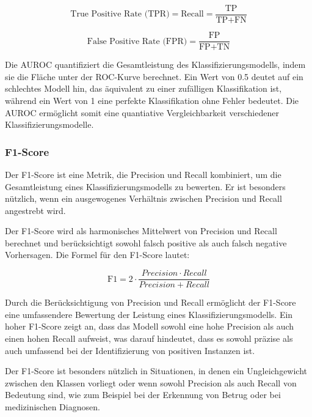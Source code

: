 \begin{equation}
    \text{True Positive Rate (TPR)} = \text{Recall} =\frac{\text{TP}}{\text{TP} + \text{FN}}
    \label{eq:TPR}
\end{equation}

\begin{equation}
    \text{False Positive Rate (FPR)} = \frac{\text{FP}}{\text{FP} + \text{TN}} 
    \label{eq:FPR}
\end{equation}

Die AUROC quantifiziert die Gesamtleistung des Klassifizierungsmodells, indem sie die Fläche unter der ROC-Kurve berechnet. Ein Wert von 0.5 deutet auf ein schlechtes Modell hin, das äquivalent zu einer zufälligen Klassifikation ist, während ein Wert von 1 eine perfekte Klassifikation ohne Fehler bedeutet. Die AUROC ermöglicht somit eine quantiative Vergleichbarkeit verschiedener Klassifizierungsmodelle.


\subsubsection{F1-Score}
Der F1-Score ist eine Metrik, die Precision und Recall kombiniert, um die Gesamtleistung eines Klassifizierungsmodells zu bewerten. Er ist besonders nützlich, wenn ein ausgewogenes Verhältnis zwischen Precision und Recall angestrebt wird.

Der F1-Score wird als harmonisches Mittelwert von Precision und Recall berechnet und berücksichtigt sowohl falsch positive als auch falsch negative Vorhersagen. Die Formel für den F1-Score lautet:

\begin{equation}
    \text{F1} = 2 \cdot \frac{Precision \cdot Recall}{Precision + Recall}
    \label{eq:F1Score}
\end{equation}

Durch die Berücksichtigung von Precision und Recall ermöglicht der F1-Score eine umfassendere Bewertung der Leistung eines Klassifizierungsmodells. Ein hoher F1-Score zeigt an, dass das Modell sowohl eine hohe Precision als auch einen hohen Recall aufweist, was darauf hindeutet, dass es sowohl präzise als auch umfassend bei der Identifizierung von positiven Instanzen ist.

Der F1-Score ist besonders nützlich in Situationen, in denen ein Ungleichgewicht zwischen den Klassen vorliegt oder wenn sowohl Precision als auch Recall von Bedeutung sind, wie zum Beispiel bei der Erkennung von Betrug oder bei medizinischen Diagnosen.


